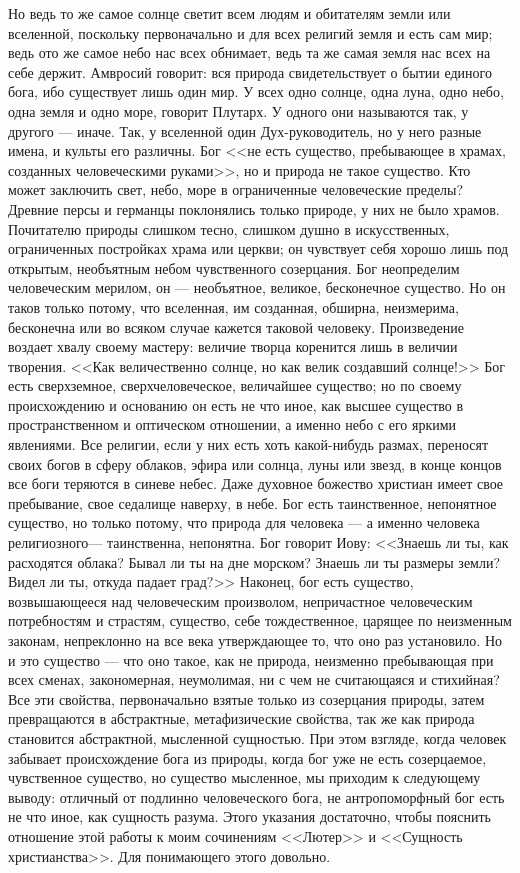\documentclass[12pt]{article}
\begin{document}
Но ведь то же самое солнце светит всем людям и обитателям земли или вселенной, поскольку первоначально и для всех религий земля и есть сам мир; ведь ото же самое небо нас всех обнимает, ведь та же самая земля нас всех на себе держит. Амвросий говорит: вся природа свидетельствует о бытии единого бога, ибо существует лишь один мир. У всех одно солнце, одна луна, одно небо, одна земля и одно море, говорит Плутарх. У одного они называются так, у другого --- иначе. Так, у вселенной один Дух-руководитель, но у него разные имена, и культы его различны. Бог <<не есть существо, пребывающее в храмах, созданных человеческими руками>>, но и природа не такое существо. Кто может заключить свет, небо, море в ограниченные человеческие пределы? Древние персы и германцы поклонялись только природе, у них не было храмов. Почитателю природы слишком тесно, слишком душно в искусственных, ограниченных постройках храма или церкви; он чувствует себя хорошо лишь под открытым, необъятным небом чувственного созерцания. Бог неопределим человеческим мерилом, он --- необъятное, великое, бесконечное существо. Но он таков только потому, что вселенная, им созданная, обширна, неизмерима, бесконечна или во всяком случае кажется таковой человеку. Произведение воздает хвалу своему мастеру: величие творца коренится лишь в величии творения. <<Как величественно солнце, но как велик создавший солнце!>> Бог есть сверхземное, сверхчеловеческое, величайшее существо; но по своему происхождению и основанию он есть не что иное, как высшее существо в пространственном и оптическом отношении, а именно небо с его яркими явлениями. Все религии, если у них есть хоть какой-нибудь размах, переносят своих богов в сферу облаков, эфира или солнца, луны или звезд, в конце концов все боги теряются в синеве небес. Даже духовное божество христиан имеет свое пребывание, свое седалище наверху, в небе. Бог есть таинственное, непонятное существо, но только потому, что природа для человека --- а именно человека религиозного--- таинственна, непонятна. Бог говорит Иову: <<Знаешь ли ты, как расходятся облака? Бывал ли ты на дне морском? Знаешь ли ты размеры земли? Видел ли ты, откуда падает град?>> Наконец, бог есть существо, возвышающееся над человеческим произволом, непричастное человеческим потребностям и страстям, существо, себе тождественное, царящее по неизменным законам, непреклонно на все века утверждающее то, что оно раз установило. Но и это существо --- что оно такое, как не природа, неизменно пребывающая при всех сменах, закономерная, неумолимая, ни с чем не считающаяся и стихийная? Все эти свойства, первоначально взятые только из созерцания природы, затем превращаются в абстрактные, метафизические свойства, так же как природа становится абстрактной, мысленной сущностью. При этом взгляде, когда человек забывает происхождение бога из природы, когда бог уже не есть созерцаемое, чувственное существо, но существо мысленное, мы приходим к следующему выводу: отличный от подлинно человеческого бога, не антропоморфный бог есть не что иное, как сущность разума. Этого указания достаточно, чтобы пояснить отношение этой работы к моим сочинениям <<Лютер>> и <<Сущность христианства>>. Для понимающего этого довольно.
\end{document}
